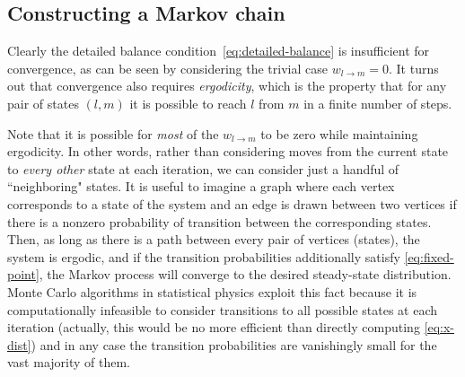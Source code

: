 \subsection{Constructing a Markov chain}

Clearly the detailed balance condition~\eqref{eq:detailed-balance} is
insufficient for convergence, as can be seen by considering the trivial case
$w_{l \to m}=0$. It turns out that convergence also requires \emph{ergodicity},
which is the property that for any pair of states $(l,m)$ it is possible to
reach $l$ from $m$ in a finite number of steps.

Note that it is possible for \emph{most} of the $w_{l \to m}$ to be zero while
maintaining ergodicity. In other words, rather than considering moves from the
current state to \emph{every other} state at each iteration, we can consider
just a handful of ``neighboring" states. It is useful to imagine a graph where
each vertex corresponds to a state of the system and an edge is drawn between
two vertices if there is a nonzero probability of transition between the
corresponding states. Then, as long as there is a path between every pair of
vertices (states), the system is ergodic, and if the transition probabilities
additionally satisfy \cref{eq:fixed-point}, the Markov process will converge to
the desired steady-state distribution. Monte Carlo algorithms in statistical
physics exploit this fact because it is computationally infeasible to consider
transitions to all possible states at each iteration (actually, this would be
no more efficient than directly computing \cref{eq:x-dist}) and in any case the
transition probabilities are vanishingly small for the vast majority of them.

